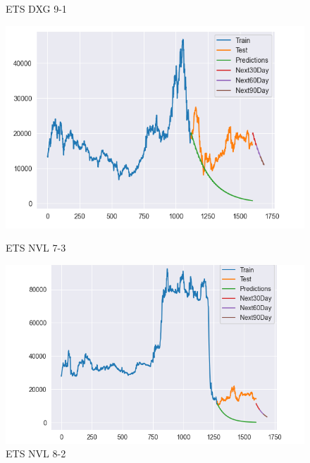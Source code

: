 \documentclass[conference]{IEEEtran}
\begin{document}
\begin{figure}[htbp]
\begin{minipage}{0.23\textwidth}
    \caption{ETS DXG 9-1}
    \label{fig:nvl_histogram}
    \end{minipage}

    \begin{minipage}{0.23\textwidth}
    \centering
    \includegraphics[width=1\textwidth]{experiment/ets/TEAM4_ETS_NVL_7_3.png}
    \caption{ETS NVL 7-3}
    \label{fig:nvl_boxplot}
    \end{minipage}
    \hfill
    \begin{minipage}{0.23\textwidth}
    \centering
    \includegraphics[width=1\textwidth]{experiment/ets/TEAM4_ETS_NVL_8_2.png}
    \caption{ETS NVL 8-2}
    \label{fig:nvl_histogram}
    \end{minipage}
    \begin{minipage}{0.23\textwidth}
    \centering

\end{minipage}
\end{figure}
\end{document}
